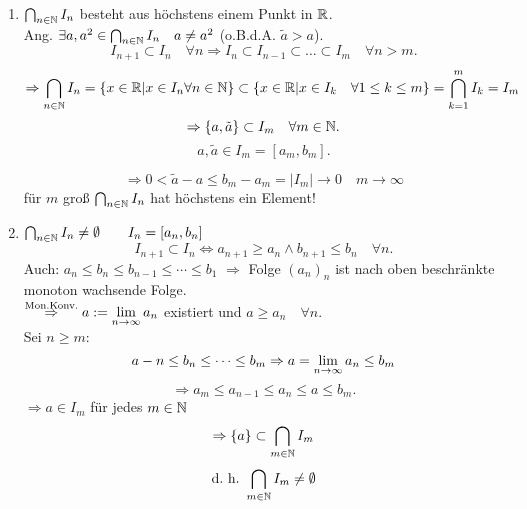 \documentclass[../ana1.tex]{subfiles}
\begin{document}
\begin{bew}
	\begin{enumerate}
		\item \( \bigcap_{n\in\mathbb{N}} I_n \) besteht aus höchstens einem Punkt in \(\mathbb{R} \).\\
		Ang. \( \exists a, a^2 \in \bigcap_{n\in\mathbb{N}} I_n \quad a\neq a^2 \) (o.B.d.A. \(\tilde{a}>a\)).\\
		\[I_{n+1} \subset I_n \quad\forall n \Rightarrow I_n \subset I_{n-1} \subset \ldots\subset I_m \quad \forall n>m.\]
		\[ \Rightarrow \bigcap_{n\in\mathbb{N}} I_n = \{ x\in\mathbb{R}| x\in I_n \forall n\in\mathbb{N} \} \subset \{ x\in\mathbb{R}|x\in I_k \quad \forall 1\leq k \leq m \} = \bigcap_{k=1}^m I_k = I_m \]
		\[ \Rightarrow \{ a,\tilde{a} \} \subset I_m \quad\forall m\in\mathbb{N}. \]
		\[a,\tilde{a} \in I_m = [a_m,b_m]. \]
		\begin{center}
		\end{center}
		\[\Rightarrow 0<\tilde{a}-a \leq b_m - a_m = |I_m| \rightarrow 0 \quad m\rightarrow\infty \]
		\Lightning{} für \(m\) groß \(\bigcap_{n\in\mathbb{N}} I_n\) hat höchstens ein Element!
		\item \( \bigcap_{n\in\mathbb{N}} I_n \neq \emptyset \qquad I_n = [a_n,b_n] \) \\
		\[I_{n+1} \subset I_n \Leftrightarrow a_{n+1} \geq a_n \wedge b_{n+1} \leq b_n \quad \forall n. \]
		Auch: \( a_n \leq b_n \leq b_{n-1} \leq \cdots\leq b_1 \)
		\( \Rightarrow \) Folge \({(a_n)}_n\) ist nach oben beschränkte monoton wachsende Folge.\\
		\( \overset{\text{Mon.Konv.}}{\Rightarrow} a:= \lim\limits_{n\rightarrow\infty} a_n \) existiert und \(a\geq a_n \quad \forall n \).\\
		Sei \(n\geq m\):
		\[a-n\leq b_n\leq\cdots\leq b_m \Rightarrow a = \lim\limits_{n\rightarrow\infty} a_n \leq b_m \]
		\[\Rightarrow a_m\leq a_{n-1}\leq a_n\leq a\leq b_m. \]
		\( \Rightarrow a\in I_m\) für jedes \(m\in\mathbb{N} \) \\
		\[  \Rightarrow \{a\}\subset \bigcap_{m\in\mathbb{N}} I_m \]
		\[ \text{d.\ h.\ } \bigcap_{m\in\mathbb{N}} I_m \neq \emptyset \]
	\end{enumerate}
\end{bew}
\end{document}
